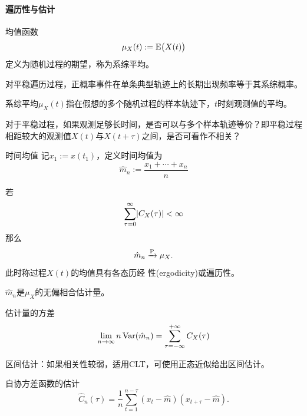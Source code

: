 \paragraph{遍历性与估计}
均值函数
\[
	\mu_X(t) := \operatorname{E}\bigl(X(t)\bigr)
\]
定义为随机过程的期望，称为系综平均。
\begin{compactitem}
	\item 对平稳遍历过程，正概率事件在单条典型轨迹上的长期出现频率等于其系综概率。
	\item 系综平均$\mu_X(t)$指在假想的多个随机过程的样本轨迹下，$t $时刻观测值的平均。
	\item 对于平稳过程，如果观测足够长时间，是否可以与多个样本轨迹等价？即平稳过程相距较大的观测值$ X(t) $与$ X(t + \tau) $之间，是否可看作不相关？
\end{compactitem}
\begin{definition}{时间均值}{}
	记$x_1 := x(t_1)$，定义时间均值为
	\begin{equation}\label{eq:ps-time-average}
		\hat m_n := \frac{x_1 + \cdots + x_n}n
	\end{equation}
\end{definition}
若
\[
	\sum_{\tau=0}^\infty \lvert C_X(\tau)\rvert < \infty
\]
那么
\begin{equation}\label{eq:ps-mean-ergodicity}
	\hat m_n \xrightarrow{\operatorname{P}} \mu_X.
\end{equation}
此时称过程$ X(t) $的均值具有各态历经
性(ergodicity)或遍历性。
\begin{compactitem}
	\item $\hat m_n$是$\mu_X$的无偏相合估计量。
	\item 估计量的方差\begin{equation}\label{eq:ps-time-average-variance}
		\lim_{n\to\infty}n\operatorname{Var}(\hat m_n) = \sum_{\tau=-\infty}^{+\infty}C_X(\tau)
	\end{equation}
\end{compactitem}
区间估计：如果相关性较弱，适用CLT，可使用正态近似给出区间估计。

自协方差函数的估计
\begin{equation}\label{eq:ps-sample-autocovariance}
	\hat C_n(\tau) = \frac1n\sum_{t=1}^{n-\tau}(x_t - \hat m)(x_{t+\tau} - \hat m).
\end{equation}
